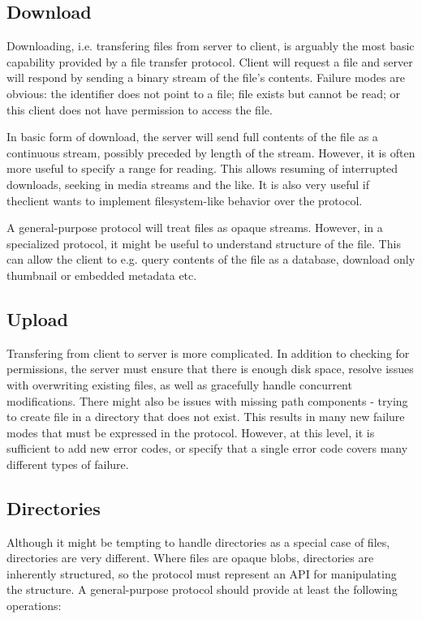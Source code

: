 \subsection{Download}

Downloading, i.e. transfering files from server to client, is arguably the most basic capability provided by
a file transfer protocol. Client will request a file and server will respond by sending a binary stream of the
file's contents. Failure modes are obvious: the identifier does not point to a file; file exists but cannot be
read; or this client does not have permission to access the file.

In basic form of download, the server will send full contents of the file as a continuous stream, possibly
preceded by length of the stream. However, it is often more useful to specify a range for reading. This allows
resuming of interrupted downloads, seeking in media streams and the like. It is also very useful if theclient
wants to implement filesystem-like behavior over the protocol.

A general-purpose protocol will treat files as opaque streams. However, in a specialized protocol, it might be
useful to understand structure of the file. This can allow the client to e.g. query contents of the file as
a database, download only thumbnail or embedded metadata etc.

\subsection{Upload}

Transfering from client to server is more complicated. In addition to checking for permissions, the server
must ensure that there is enough disk space, resolve issues with overwriting existing files, as well as
gracefully handle concurrent modifications. There might also be issues with missing path components - trying
to create file in a directory that does not exist. This results in many new failure modes that must be
expressed in the protocol. However, at this level, it is sufficient to add new error codes, or specify that
a single error code covers many different types of failure.

\subsection{Directories}

Although it might be tempting to handle directories as a special case of files, directories are very
different. Where files are opaque blobs, directories are inherently structured, so the protocol must represent
an API for manipulating the structure. A general-purpose protocol should provide at least the following
operations:

